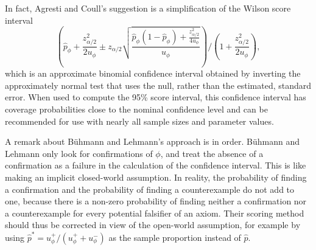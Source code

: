 \documentclass[a4paper]{article}
\newcounter{ex}
\begin{document}
In fact, Agresti and Coull's suggestion is a simplification of the Wilson score interval
\begin{equation}
  \left(
    \hat{p}_\phi + \frac{z_{\alpha/2}^2}{2u_\phi} \pm
    z_{\alpha/2}\sqrt{\frac{\hat{p}_\phi(1 - \hat{p}_\phi) + \frac{z_{\alpha/2}^2}{4u_\phi}}{u_\phi}}
  \right) / \left(1 + \frac{z_{\alpha/2}^2}{2u_\phi}\right),
\end{equation}
which is an approximate binomial confidence interval obtained by inverting the approximately
normal test that uses the null, rather than the estimated, standard error.
When used to compute the 95\% score interval, this confidence interval
has coverage probabilities close to the nominal confidence level and can be recommended
for use with nearly all sample sizes and parameter values.

A remark about B\"uhmann and Lehmann's approach is in order.
B\"uhmann and Lehmann only look for confirmations of $\phi$, and treat
the absence of a confirmation as a failure in the calculation of the confidence interval.
This is like making an implicit closed-world assumption. In reality, the probability
of finding a confirmation and the probability of finding a counterexample do not add to one,
because there is a non-zero probability of finding neither a confirmation nor a counterexample
for every potential falsifier of an axiom. Their scoring method should thus be
corrected in view of the open-world assumption, for example by using
$\hat{p}^* = u_\phi^+/(u_\phi^+ + u_\phi^-)$ as the sample proportion instead of $\hat{p}$.
\end{document}
